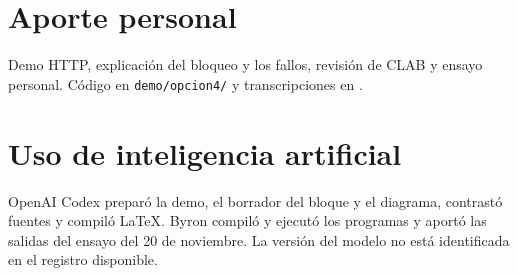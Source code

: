 \documentclass[11pt,a4paper]{article}
\begin{document}

\section*{Aporte personal}
Demo HTTP, explicación del bloqueo y los fallos, revisión de CLAB y ensayo personal. Código en \texttt{demo/opcion4/} y transcripciones en .
\section*{Uso de inteligencia artificial}
OpenAI Codex preparó la demo, el borrador del bloque y el diagrama, contrastó fuentes y compiló LaTeX. Byron compiló y ejecutó los programas y aportó las salidas del ensayo del 20 de noviembre. La versión del modelo no está identificada en el registro disponible.
\end{document}
